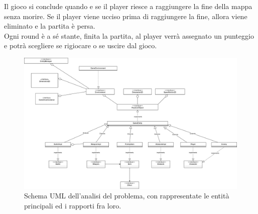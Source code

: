 \textsf{\small Il gioco si conclude quando e se il player riesce a raggiungere la fine della mappa senza morire.}
\textsf{\small Se il player viene ucciso prima di raggiungere la fine, allora viene eliminato e la partita è persa.}\\

\textsf{\small Ogni round è a sé stante, finita la partita, al player verrà assegnato un punteggio e potrà scegliere se rigiocare o se uscire dal gioco.}\\


	\begin{figure}[h]
		\centering{}
		\includegraphics[width=1.2\linewidth]{./img/model.png}
		\caption{Schema UML dell'analisi del problema, con rappresentate le entità principali ed i rapporti fra loro.}
		\label{img:analysis}
	\end{figure}

